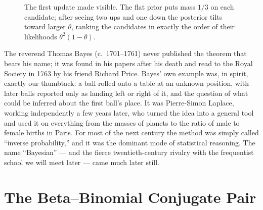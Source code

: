\begin{figure}[H]
\centering
{}
\caption{The first update made visible. The flat prior puts mass $1/3$ on each candidate;
after seeing two ups and one down the posterior tilts toward larger $\theta$, ranking the
candidates in exactly the order of their likelihoods $\theta^2(1-\theta)$.}
\label{ch31:fig-discrete}
\end{figure}

\begin{historybox}
The reverend Thomas Bayes (c.\ 1701--1761) never published the theorem that bears his
name; it was found in his papers after his death and read to the Royal Society in 1763 by
his friend Richard Price. Bayes' own example was, in spirit, exactly our thumbtack: a ball
rolled onto a table at an unknown position, with later balls reported only as landing left
or right of it, and the question of what could be inferred about the first ball's place.
It was Pierre-Simon Laplace, working independently a few years later, who turned the idea
into a general tool and used it on everything from the masses of planets to the ratio of
male to female births in Paris. For most of the next century the method was simply called
``inverse probability,'' and it was the dominant mode of statistical reasoning. The name
``Bayesian'' --- and the fierce twentieth-century rivalry with the frequentist school we
will meet later --- came much later still.
\end{historybox}

\section{The Beta--Binomial Conjugate Pair}
\label{ch31:beta-binomial}

